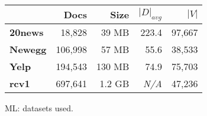 \begin{figure}[t]
\centering
{\small
\begin{tabular}{|l|r|r|r|r|}
    \hline & \textbf{Docs} & \textbf{Size} & \textbf{$|D|_{avg}$} & \textbf{$|V|$} \\
    \hline
    \textbf{20news}  & 18,828     & 39 MB  & 223.4      & 97,667     \\
    \textbf{Newegg}  & 106,998    & 57 MB  & 55.6       & 38,533     \\
    \textbf{Yelp}    & 194,543    & 130 MB & 74.9       & 75,703 \\
    \textbf{rcv1}    & 697,641    & 1.2 GB & \emph{N/A} & 47,236 \\
    \hline
\end{tabular}
}
\caption{ML: datasets used.}
\label{fig:ml-datasets}
\end{figure}
